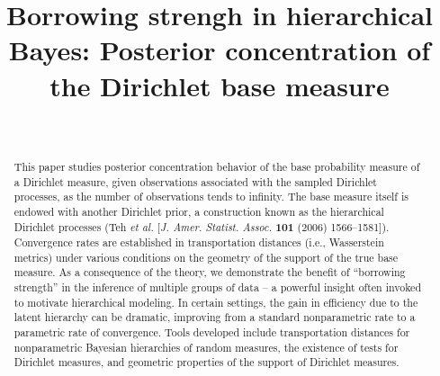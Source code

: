 \documentclass[MSNbibl,number,citesort]{arxbj}
\begin{document}
%
\begin{frontmatter}

\title{Borrowing strengh in hierarchical Bayes: Posterior
concentration of the Dirichlet base measure}

\begin{aug}
\author[A]{~\corref{}}
\address[A]{Department of Statistics,
University of Michigan,
456 West Hall,
Ann Arbor, MI 48109-1107,
USA.\\ }
\end{aug}

%
%

%
\begin{abstract}
This paper studies posterior concentration behavior of the base
probability measure of a Dirichlet measure,
given observations associated with the sampled Dirichlet processes,
as the number of observations tends to infinity.
The base measure itself is endowed with another Dirichlet prior,
a construction known as the hierarchical Dirichlet
processes (Teh \textit{et al.}
[\textit{J. Amer. Statist. Assoc.} \textbf{101} (2006) 1566--1581]).
Convergence rates are established in transportation distances (i.e.,
Wasserstein metrics) under various
conditions on the geometry of the support of the true base measure.
As a consequence of the theory, we demonstrate
the benefit of ``borrowing strength'' in the inference of multiple
groups of data -- a powerful insight often invoked to motivate
hierarchical modeling.
In certain settings, the gain in efficiency due to the latent hierarchy
can be dramatic, improving
from a standard nonparametric rate to a parametric rate of
convergence. Tools developed include transportation distances for
nonparametric Bayesian hierarchies of random measures,
the existence of tests for Dirichlet measures,
and geometric properties of the support of Dirichlet measures.
\end{abstract}

%
\begin{keyword}
\end{keyword}
%
\end{frontmatter}
\end{document}
